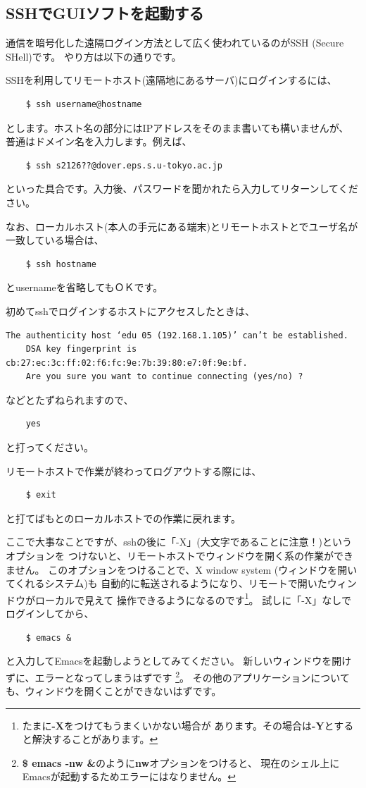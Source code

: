 \documentclass[a4j]{ltjsreport}
\begin{document}
    \subsection{SSHでGUIソフトを起動する}
    通信を暗号化した遠隔ログイン方法として広く使われているのがSSH (Secure SHell)です。
    やり方は以下の通りです。

    SSHを利用してリモートホスト(遠隔地にあるサーバ)にログインするには、
    \begin{verbatim}
    $ ssh username@hostname
    \end{verbatim}
    とします。ホスト名の部分にはIPアドレスをそのまま書いても構いませんが、
    普通はドメイン名を入力します。例えば、
    \begin{verbatim}
    $ ssh s2126??@dover.eps.s.u-tokyo.ac.jp
    \end{verbatim}
    といった具合です。入力後、パスワードを聞かれたら入力してリターンしてください。

    なお、ローカルホスト(本人の手元にある端末)とリモートホストとでユーザ名が一致している場合は、
    \begin{verbatim}
    $ ssh hostname
    \end{verbatim}
    とusernameを省略してもＯＫです。

    初めてsshでログインするホストにアクセスしたときは、
    \begin{Verbatim}[baselinestretch=0.5]
    The authenticity host ‘edu 05 (192.168.1.105)’ can’t be established.
    DSA key fingerprint is cb:27:ec:3c:ff:02:f6:fc:9e:7b:39:80:e7:0f:9e:bf.
    Are you sure you want to continue connecting (yes/no) ?
    \end{Verbatim}
    などとたずねられますので、
    \begin{verbatim}
    yes 
    \end{verbatim}
    と打ってください。

    リモートホストで作業が終わってログアウトする際には、
    \begin{verbatim}
    $ exit
    \end{verbatim}
    と打てばもとのローカルホストでの作業に戻れます。

    ここで大事なことですが、sshの後に「-X」(大文字であることに注意！)というオプションを
    つけないと、リモートホストでウィンドウを開く系の作業ができません。
    このオプションをつけることで、X window system (ウィンドウを開いてくれるシステム)も
    自動的に転送されるようになり、リモートで開いたウィンドウがローカルで見えて
    操作できるようになるのです\footnote{たまに\textbf{-X}をつけてもうまくいかない場合が
    あります。その場合は\textbf{-Y}とすると解決することがあります。}。
    試しに「-X」なしでログインしてから、
    \begin{verbatim}
    $ emacs &
    \end{verbatim}
    と入力してEmacsを起動しようとしてみてください。
    新しいウィンドウを開けずに、エラーとなってしまうはずです
    \footnote{\textbf{\$ emacs -nw \&}のように\textbf{nw}オプションをつけると、
    現在のシェル上にEmacsが起動するためエラーにはなりません。}。
    その他のアプリケーションについても、ウィンドウを開くことができないはずです。
\end{document}
